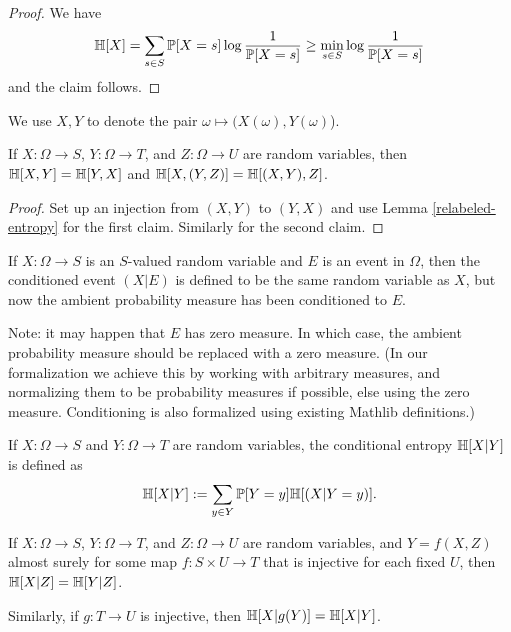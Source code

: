 \begin{proof}
  \leanok
  We have
  $$ \mathbb{H}[X] = \sum_{s \in S} \mathbb{P}[X=s] \log \frac{1}{\mathbb{P}[X=s]} \geq \min_{s \in S} \log \frac{1}{\mathbb{P}[X=s]}$$
  and the claim follows.
\end{proof}

We use $X,Y$ to denote the pair $\omega \mapsto (X(\omega),Y(\omega)$).

\begin{lemma}
  \label{entropy-comm}
  \leanok
  If $X: \Omega \to S$, $Y: \Omega \to T$, and $Z: \Omega \to U$ are random variables, then $\mathbb{H}[X, Y] = \mathbb{H}[Y, X]$ and $\mathbb{H}[X, (Y,Z)] = \mathbb{H}[(X,Y), Z]$.
\end{lemma}
\begin{proof}
  \leanok
  Set up an injection from $(X,Y)$ to $(Y,X)$ and use Lemma \ref{relabeled-entropy} for the first claim. Similarly for the second claim.
\end{proof}


\begin{definition}
  \label{condition-event-def}
  \leanok
  If $X: \Omega \to S$ is an $S$-valued random variable and $E$ is an event in $\Omega$, then the conditioned event $(X|E)$ is defined to be the same random variable as $X$, but now the ambient probability measure has been conditioned to $E$.
\end{definition}

Note: it may happen that $E$ has zero measure.  In which case, the ambient probability measure should be replaced with a zero measure.  (In our formalization we achieve this by working with arbitrary measures, and normalizing them to be probability measures if possible, else using the zero measure.  Conditioning is also formalized using existing Mathlib definitions.)

\begin{definition}
  \label{conditional-entropy-def}
  \leanok
  If $X: \Omega \to S$ and $Y: \Omega \to T$ are random variables, the conditional entropy $\mathbb{H}[X|Y]$ is defined as
  $$ \mathbb{H}[X|Y] := \sum_{y \in Y} \mathbb{P}[Y = y] \mathbb{H}[(X | Y=y)].$$
\end{definition}

\begin{lemma}\label{relabeled-entropy-cond}
  \leanok
  If $X: \Omega \to S$, $Y: \Omega \to T$, and $Z: \Omega \to U$ are random variables, and $Y = f(X,Z)$ almost surely for some map $f: S \times U \to T$ that is injective for each fixed $U$, then $\mathbb{H}[X|Z] = \mathbb{H}[Y|Z]$.

  Similarly, if $g: T \to U$ is injective, then $\mathbb{H}[X|g(Y)] = \mathbb{H}[X|Y]$.
\end{lemma}

